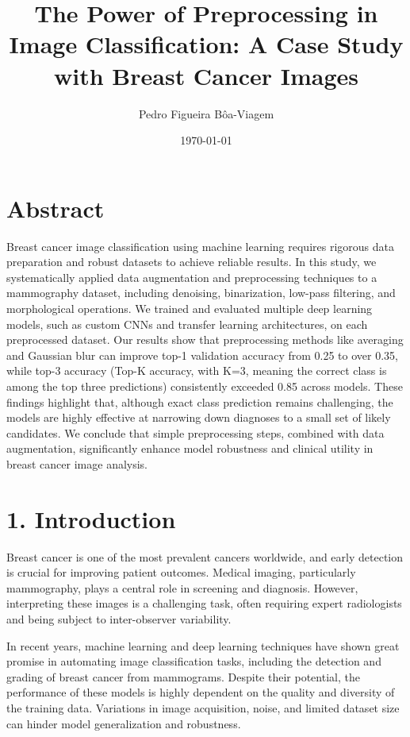 \documentclass[12pt]{article}
\title{The Power of Preprocessing in Image Classification: A Case Study with Breast Cancer Images}
\author{Pedro Figueira Bôa-Viagem}
\date{\small \today}
\renewcommand{\maketitle}{
  \begin{flushleft}
    {\LARGE\bfseries \thetitle}
    \vspace{1em}
    
    \begin{minipage}[t]{0.5\textwidth}
      \raggedright
      \theauthor
    \end{minipage}%
    \begin{minipage}[t]{0.5\textwidth}
      \raggedleft
      \thedate
    \end{minipage}
  \end{flushleft}
  \vspace{2em}
}
\begin{document}
\maketitle

\section*{Abstract}

Breast cancer image classification using machine learning requires rigorous data preparation and robust datasets to achieve reliable results. In this study, we systematically applied data augmentation and preprocessing techniques to a mammography dataset, including denoising, binarization, low-pass filtering, and morphological operations. We trained and evaluated multiple deep learning models, such as custom CNNs and transfer learning architectures, on each preprocessed dataset. Our results show that preprocessing methods like averaging and Gaussian blur can improve top-1 validation accuracy from 0.25 to over 0.35, while top-3 accuracy (Top-K accuracy, with K=3, meaning the correct class is among the top three predictions) consistently exceeded 0.85 across models. These findings highlight that, although exact class prediction remains challenging, the models are highly effective at narrowing down diagnoses to a small set of likely candidates. We conclude that simple preprocessing steps, combined with data augmentation, significantly enhance model robustness and clinical utility in breast cancer image analysis.

\section*{1. Introduction}

Breast cancer is one of the most prevalent cancers worldwide, and early detection is crucial for improving patient outcomes. Medical imaging, particularly mammography, plays a central role in screening and diagnosis. However, interpreting these images is a challenging task, often requiring expert radiologists and being subject to inter-observer variability.

In recent years, machine learning and deep learning techniques have shown great promise in automating image classification tasks, including the detection and grading of breast cancer from mammograms. Despite their potential, the performance of these models is highly dependent on the quality and diversity of the training data. Variations in image acquisition, noise, and limited dataset size can hinder model generalization and robustness.
\end{document}
